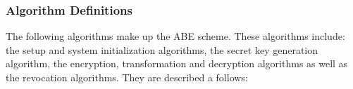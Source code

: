 \subsubsection*{Algorithm Definitions}

The following algorithms make up the ABE scheme. These algorithms include: the setup and system initialization algorithms, the secret key generation algorithm, the encryption, transformation and decryption algorithms as well as the revocation algorithms. They are described a follows: 
